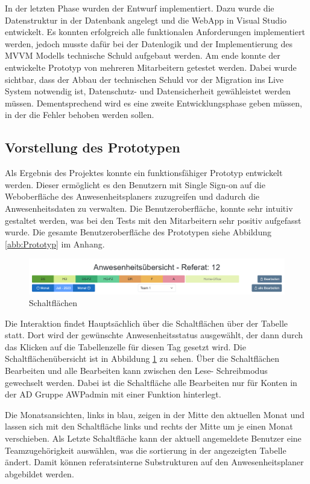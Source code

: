 In der letzten Phase wurden der Entwurf implementiert. Dazu wurde die Datenstruktur in der Datenbank angelegt und die WebApp in Visual Studio entwickelt. Es konnten erfolgreich alle funktionalen Anforderungen implementiert werden, jedoch musste dafür bei der Datenlogik und der Implementierung des MVVM Modells technische Schuld aufgebaut werden. Am ende konnte der entwickelte Prototyp von mehreren Mitarbeitern getestet werden. Dabei wurde sichtbar, dass der Abbau der technischen Schuld vor der Migration ins Live System notwendig ist, Datenschutz- und Datensicherheit gewähleistet werden müssen. Dementsprechend wird es eine zweite Entwicklungsphase geben müssen, in der die Fehler behoben werden sollen.

\subsection{Vorstellung des Prototypen}
\label{sec:Prototyp}
Als Ergebnis des Projektes konnte ein funktionsfähiger Prototyp entwickelt werden. Dieser ermöglicht es den Benutzern mit Single Sign-on auf die Weboberfläche des Anwesenheitsplaners zuzugreifen und dadurch die Anwesenheitsdaten zu verwalten. Die Benutzeroberfläche, konnte sehr intuitiv gestaltet werden, was bei den Tests mit den Mitarbeitern sehr positiv aufgefasst wurde. Die gesamte Benutzeroberfläche des Prototypen siehe Abbildung \ref{abb:Prototyp} im Anhang.

\begin{figure}[htb]
    \centering
    \includegraphics[width=1\textwidth,angle=0]{abb/Buttons_GUI.png}
    \caption[Beschreibung]{Schaltflächen}
    \label{abb:Buttons_GUI}
\end{figure}

Die Interaktion findet Hauptsächlich über die Schaltflächen über der Tabelle statt. Dort wird der gewünschte Anwesenheitsstatus ausgewählt, der dann durch das Klicken auf die Tabellenzelle für diesen Tag gesetzt wird. Die Schaltflächenübersicht ist in Abbildung \ref{abb:Buttons_GUI} zu sehen. Über die Schaltflächen Bearbeiten und alle Bearbeiten kann zwischen den Lese- \bzw Schreibmodus gewechselt werden. Dabei ist die Schaltfläche alle Bearbeiten nur für Konten in der AD Gruppe AWPadmin mit einer Funktion hinterlegt.

Die Monatsansichten, links in blau, zeigen in der Mitte den aktuellen Monat und lassen sich mit den Schaltfläche links und rechts der Mitte um je einen Monat verschieben. Als Letzte Schaltfläche kann der aktuell angemeldete Benutzer eine Teamzugehörigkeit auswählen, was die sortierung in der angezeigten Tabelle ändert. Damit können referatsinterne Substrukturen auf den Anwesenheitsplaner abgebildet werden.

